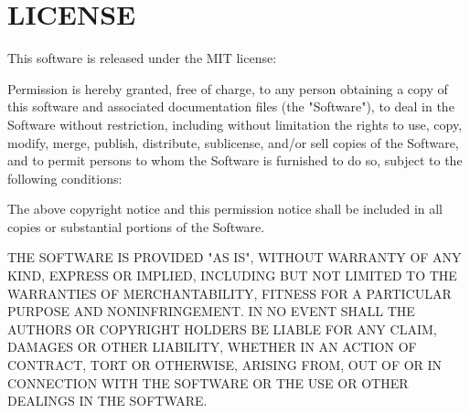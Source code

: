 \chapter{LICENSE}
\hypertarget{md__2home_2solype_2delivery_2current__days_2Mannheim_2front_2node__modules_2is-typedarray_2LICENSE}{}\label{md__2home_2solype_2delivery_2current__days_2Mannheim_2front_2node__modules_2is-typedarray_2LICENSE}
This software is released under the MIT license\+:

Permission is hereby granted, free of charge, to any person obtaining a copy of this software and associated documentation files (the "{}\+Software"{}), to deal in the Software without restriction, including without limitation the rights to use, copy, modify, merge, publish, distribute, sublicense, and/or sell copies of the Software, and to permit persons to whom the Software is furnished to do so, subject to the following conditions\+:

The above copyright notice and this permission notice shall be included in all copies or substantial portions of the Software.

THE SOFTWARE IS PROVIDED "{}\+AS IS"{}, WITHOUT WARRANTY OF ANY KIND, EXPRESS OR IMPLIED, INCLUDING BUT NOT LIMITED TO THE WARRANTIES OF MERCHANTABILITY, FITNESS FOR A PARTICULAR PURPOSE AND NONINFRINGEMENT. IN NO EVENT SHALL THE AUTHORS OR COPYRIGHT HOLDERS BE LIABLE FOR ANY CLAIM, DAMAGES OR OTHER LIABILITY, WHETHER IN AN ACTION OF CONTRACT, TORT OR OTHERWISE, ARISING FROM, OUT OF OR IN CONNECTION WITH THE SOFTWARE OR THE USE OR OTHER DEALINGS IN THE SOFTWARE. 